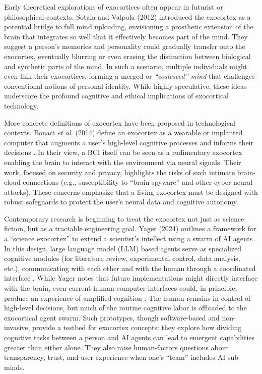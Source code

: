 \documentclass[11pt]{article}
\newcommand{\quotes}[1]{``#1''}
\begin{document}
Early theoretical explorations of exocortices often appear in futurist or philosophical contexts. Sotala and Valpola (2012) introduced the exocortex as a potential bridge to full mind uploading, envisioning a prosthetic extension of the brain that integrates so well that it effectively becomes part of the mind. They suggest a person's memories and personality could gradually transfer onto the exocortex, eventually blurring or even erasing the distinction between biological and synthetic parts of the mind. In such a scenario, multiple individuals might even link their exocortices, forming a merged or \textit{\quotes{coalesced} mind} that challenges conventional notions of personal identity. While highly speculative, these ideas underscore the profound cognitive and ethical implications of exocortical technology.

More concrete definitions of exocortex have been proposed in technological contexts. Bonaci \textit{et al.} (2014) define an exocortex as a wearable or implanted computer that augments a user's high-level cognitive processes and informs their decisions \cite{Bonaci2014}. In their view, a BCI itself can be seen as a rudimentary exocortex enabling the brain to interact with the environment via neural signals. Their work, focused on security and privacy, highlights the risks of such intimate brain-cloud connections (e.g., susceptibility to \quotes{brain spyware} and other cyber-neural attacks). These concerns emphasize that a living exocortex must be designed with robust safeguards to protect the user's neural data and cognitive autonomy.

Contemporary research is beginning to treat the exocortex not just as science fiction, but as a tractable engineering goal. Yager (2024) outlines a framework for a \quotes{science exocortex} to extend a scientist's intellect using a swarm of AI agents \cite{Yager2024}. In this design, large language model (LLM) based agents serve as specialized cognitive modules (for literature review, experimental control, data analysis, etc.), communicating with each other and with the human through a coordinated interface \cite{Yager2024}. While Yager notes that future implementations might directly interface with the brain, even current human-computer interfaces could, in principle, produce an experience of amplified cognition \cite{Yager2024}. The human remains in control of high-level decisions, but much of the routine cognitive labor is offloaded to the exocortical agent swarm. Such prototypes, though software-based and non-invasive, provide a testbed for exocortex concepts: they explore how dividing cognitive tasks between a person and AI agents can lead to emergent capabilities greater than either alone. They also raise human-factors questions about transparency, trust, and user experience when one's \quotes{team} includes AI sub-minds.
\end{document}
